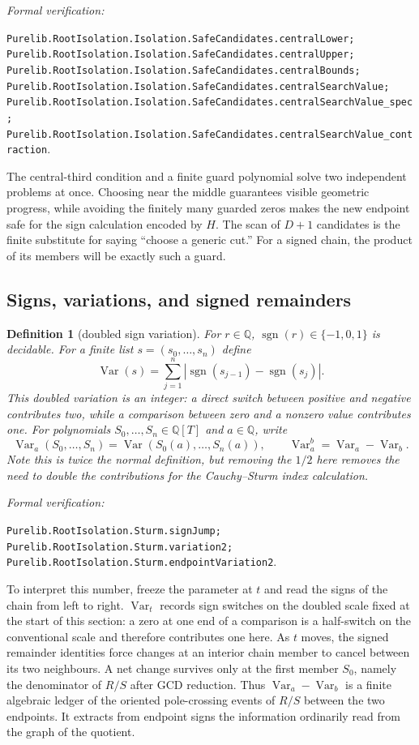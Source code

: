 \documentclass[11pt]{article}
\newtheorem{definition}[theorem]{Definition}
\newcommand{\Q}{\mathbb{Q}}
\newcommand{\Var}{\operatorname{Var}}
\newcommand{\leanref}[1]{\par\smallskip\noindent
  \emph{Formal verification:}\par\nobreak
  {\raggedright\nolinkurl{#1}.\par}}
\begin{document}
\leanref{Purelib.RootIsolation.Isolation.SafeCandidates.centralLower;
Purelib.RootIsolation.Isolation.SafeCandidates.centralUpper;
Purelib.RootIsolation.Isolation.SafeCandidates.centralBounds;
Purelib.RootIsolation.Isolation.SafeCandidates.centralSearchValue;
Purelib.RootIsolation.Isolation.SafeCandidates.centralSearchValue_spec;
Purelib.RootIsolation.Isolation.SafeCandidates.centralSearchValue_contraction}

The central-third condition and a finite guard polynomial solve two
independent problems at once.  Choosing near the middle guarantees visible
geometric progress, while avoiding the finitely many guarded zeros makes the
new endpoint safe for the sign calculation encoded by $H$.  The scan of
$D+1$ candidates is the finite substitute for saying ``choose a generic
cut.''  For a signed chain, the product of its members will be exactly such
a guard.

\subsection{Signs, variations, and signed remainders}

\begin{definition}[doubled sign variation]
\label{def:sign-variation}
For $r\in\Q$, $\operatorname{sgn}(r)\in\{-1,0,1\}$ is decidable.  For a
finite list $s=(s_0,\dots,s_n)$ define
\begin{equation}
\label{eq:variation}
 \Var(s)=\sum_{j=1}^{n}|\operatorname{sgn}(s_{j-1})-
                                  \operatorname{sgn}(s_j)|.
\end{equation}
This doubled variation is an integer: a direct switch between positive and
negative contributes two, while a comparison between zero and a nonzero
value contributes one.  For polynomials $S_0,\dots,S_n\in\Q[T]$ and
$a\in\Q$, write
\[
 \Var_a(S_0,\dots,S_n)=\Var(S_0(a),\dots,S_n(a)),\qquad
 \Var_a^b=\Var_a-\Var_b.
\]
Note this is twice the normal definition, but removing the $1/2$ here removes the
need to double the contributions for the Cauchy--Sturm index calculation.
\end{definition}

\leanref{Purelib.RootIsolation.Sturm.signJump; Purelib.RootIsolation.Sturm.variation2;
Purelib.RootIsolation.Sturm.endpointVariation2}

To interpret this number, freeze the parameter at $t$ and read the signs of
the chain from left to right.  $\Var_t$ records sign switches on the
doubled scale fixed at the start of this section: a zero at one end of a
comparison is a half-switch on the conventional scale and therefore
contributes one here.  As $t$ moves, the signed remainder identities force
changes at an interior chain member to
cancel between its two neighbours.  A net change survives only at the first
member $S_0$, namely the denominator of $R/S$ after GCD reduction.  Thus
$\Var_a-\Var_b$ is a finite algebraic ledger of the oriented
pole-crossing events of $R/S$ between the two endpoints.  It extracts from
endpoint signs the information ordinarily read from the graph of the
quotient.
\end{document}

